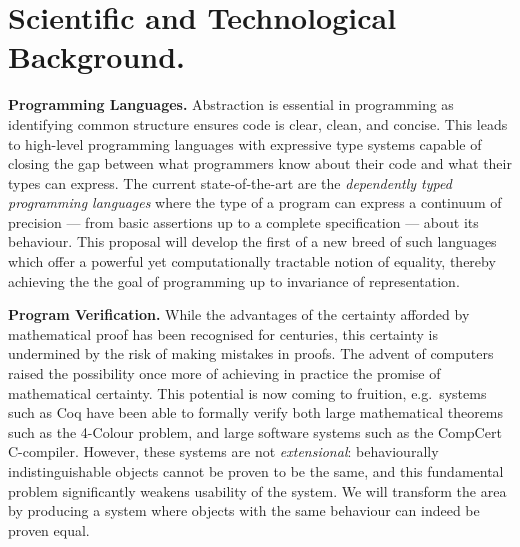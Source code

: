 \documentclass[a4paper,11pt]{article}
\newcommand{\eg}{{e.g.}\ }
\begin{document}


\vspace*{-0.1in} 
\section{Scientific and Technological Background.}
\vspace*{-0.1in} 

{\bf Programming Languages.} Abstraction is essential in programming
as identifying common structure ensures code is clear, clean, and
concise. This leads to high-level programming languages with
expressive type systems capable of closing the gap between what
programmers know about their code and what their types can express.
The current state-of-the-art are the {\em dependently typed
  programming languages} where the type of a program can express a
continuum of precision --- from basic assertions up to a complete
specification --- about its behaviour. This proposal will develop the
first of a new breed of such languages which offer a powerful yet
computationally tractable notion of equality, thereby achieving the
the goal of programming up to invariance of representation.



{\bf Program Verification.} While the advantages of the certainty
afforded by mathematical proof has been recognised for centuries, this
certainty is undermined by the risk of making mistakes in
proofs. The advent of computers raised the possibility once more of
achieving in practice the promise of mathematical certainty. This
potential is now coming to fruition, \eg systems such as Coq have been
able to formally verify both large mathematical theorems such as the
4-Colour problem, and large software systems such as the CompCert
C-compiler. However, these systems are not {\em extensional}:
behaviourally indistinguishable objects cannot be proven to be the
same, and this fundamental problem significantly weakens usability of the
system. We will transform the area by producing a system where
objects with the same behaviour can indeed be proven equal.
\end{document}

